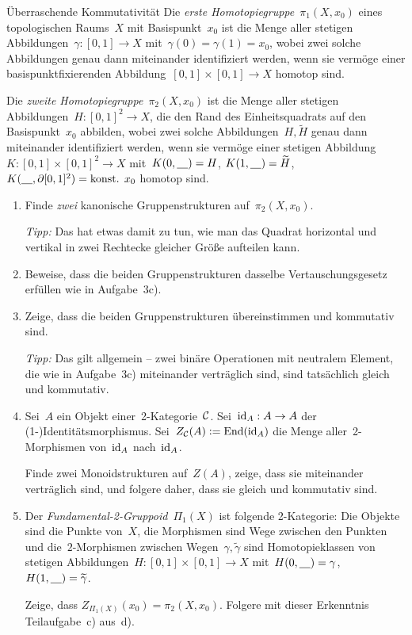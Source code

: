 \documentclass{uebblatt}
\begin{document}
\begin{aufgabe}{Überraschende Kommutativität}
Die \emph{erste Homotopiegruppe}~$\pi_1(X,x_0)$ eines topologischen Raums~$X$
mit Basispunkt~$x_0$ ist die Menge aller stetigen Abbildungen~$\gamma : [0,1]
\to X$ mit~$\gamma(0) = \gamma(1) = x_0$, wobei zwei solche Abbildungen genau
dann miteinander identifiziert werden, wenn sie vermöge einer
basispunktfixierenden Abbildung~$[0,1] \times [0,1] \to X$ homotop sind.

Die \emph{zweite Homotopiegruppe}~$\pi_2(X,x_0)$ ist
die Menge aller stetigen Abbildungen~$H : [0,1]^2 \to X$, die den Rand des
Einheitsquadrats auf den Basispunkt~$x_0$ abbilden, wobei zwei solche
Abbildungen~$H, \widetilde H$ genau dann miteinander identifiziert werden, wenn sie vermöge
einer stetigen Abbildung~$K : [0,1] \times [0,1]^2 \to X$
mit~$K(0,\underline{\quad}) = H$, $K(1,\underline{\quad}) = \widetilde H$,
$K(\underline{\quad},\partial [0,1]^2) = \text{konst. $x_0$}$ homotop
sind.

\begin{enumerate}
\item Finde \emph{zwei} kanonische Gruppenstrukturen auf~$\pi_2(X,x_0)$.

\emph{Tipp:} Das hat etwas damit zu tun, wie man das Quadrat horizontal und
vertikal in zwei Rechtecke gleicher Größe aufteilen kann.

\item Beweise, dass die beiden Gruppenstrukturen dasselbe Vertauschungsgesetz
erfüllen wie in Aufgabe~3c).
\item Zeige, dass die beiden Gruppenstrukturen übereinstimmen und kommutativ
sind.

\emph{Tipp:} Das gilt allgemein -- zwei binäre Operationen mit neutralem
Element, die wie in Aufgabe~3c) miteinander verträglich sind, sind tatsächlich
gleich und kommutativ.

\item Sei~$A$ ein Objekt einer~2-Kategorie~$\mathcal{C}$. Sei~$\mathrm{id}_A : A \to A$ der
(1-)Identitätsmorphismus. Sei~$Z_{\mathcal{C}}(A) \vcentcolon= \mathrm{End}(\mathrm{id}_A)$ die Menge
aller~2-Morphismen von~$\mathrm{id}_A$ nach~$\mathrm{id}_A$.

Finde zwei Monoidstrukturen auf~$Z(A)$, zeige, dass sie miteinander
verträglich sind, und folgere daher, dass sie gleich und kommutativ sind.

\item Der \emph{Fundamental-2-Gruppoid}~$\Pi_1(X)$ ist folgende 2-Kategorie:
Die Objekte sind die Punkte von~$X$, die Morphismen sind Wege zwischen den
Punkten und die~$2$-Morphismen zwischen Wegen~$\gamma, \widetilde\gamma$ sind
Homotopieklassen von stetigen Abbildungen~$H : [0,1] \times [0,1] \to X$
mit~$H(0,\underline{\quad}) = \gamma$, $H(1,\underline{\quad}) = \widetilde\gamma$.

Zeige, dass $Z_{\Pi_1(X)}(x_0) = \pi_2(X,x_0)$. Folgere mit dieser Erkenntnis
Teilaufgabe~c) aus~d).
\end{enumerate}
\end{aufgabe}
\end{document}
